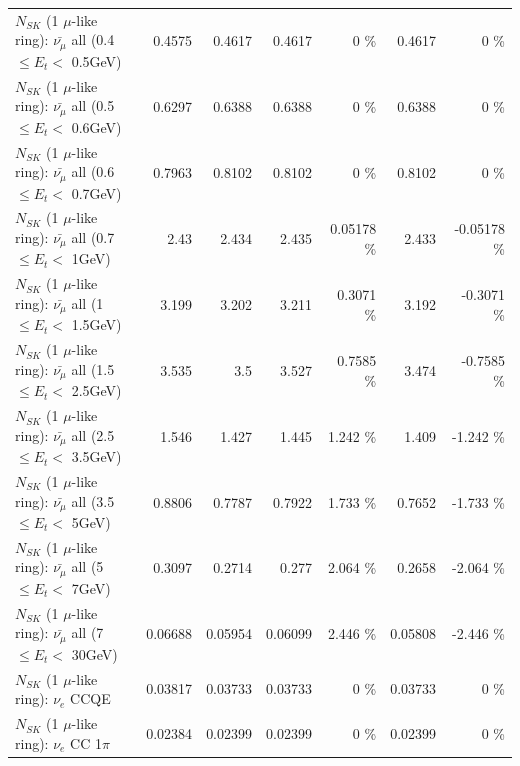\begin{table}
\begin{tabular}{| l | r | r | r  r | r  r |}
 $N_{SK}$ (1 $\mu$-like ring): $\bar{\nu_{\mu}}$ all (0.4 $\leq E_{t} <$ 0.5GeV) &          0.4575 &          0.4617 &          0.4617 &        0 \%  &          0.4617 &        0 \%  \\ 
 $N_{SK}$ (1 $\mu$-like ring): $\bar{\nu_{\mu}}$ all (0.5 $\leq E_{t} <$ 0.6GeV) &          0.6297 &          0.6388 &          0.6388 &        0 \%  &          0.6388 &        0 \%  \\ 
 $N_{SK}$ (1 $\mu$-like ring): $\bar{\nu_{\mu}}$ all (0.6 $\leq E_{t} <$ 0.7GeV) &          0.7963 &          0.8102 &          0.8102 &        0 \%  &          0.8102 &        0 \%  \\ 
   $N_{SK}$ (1 $\mu$-like ring): $\bar{\nu_{\mu}}$ all (0.7 $\leq E_{t} <$ 1GeV) &            2.43 &           2.434 &           2.435 &  0.05178 \%  &           2.433 & -0.05178 \%  \\ 
   $N_{SK}$ (1 $\mu$-like ring): $\bar{\nu_{\mu}}$ all (1 $\leq E_{t} <$ 1.5GeV) &           3.199 &           3.202 &           3.211 &   0.3071 \%  &           3.192 &  -0.3071 \%  \\ 
 $N_{SK}$ (1 $\mu$-like ring): $\bar{\nu_{\mu}}$ all (1.5 $\leq E_{t} <$ 2.5GeV) &           3.535 &             3.5 &           3.527 &   0.7585 \%  &           3.474 &  -0.7585 \%  \\ 
 $N_{SK}$ (1 $\mu$-like ring): $\bar{\nu_{\mu}}$ all (2.5 $\leq E_{t} <$ 3.5GeV) &           1.546 &           1.427 &           1.445 &    1.242 \%  &           1.409 &   -1.242 \%  \\ 
   $N_{SK}$ (1 $\mu$-like ring): $\bar{\nu_{\mu}}$ all (3.5 $\leq E_{t} <$ 5GeV) &          0.8806 &          0.7787 &          0.7922 &    1.733 \%  &          0.7652 &   -1.733 \%  \\ 
     $N_{SK}$ (1 $\mu$-like ring): $\bar{\nu_{\mu}}$ all (5 $\leq E_{t} <$ 7GeV) &          0.3097 &          0.2714 &           0.277 &    2.064 \%  &          0.2658 &   -2.064 \%  \\ 
    $N_{SK}$ (1 $\mu$-like ring): $\bar{\nu_{\mu}}$ all (7 $\leq E_{t} <$ 30GeV) &         0.06688 &         0.05954 &         0.06099 &    2.446 \%  &         0.05808 &   -2.446 \%  \\ 
\hline
\hline
\hline
                                      $N_{SK}$ (1 $\mu$-like ring): $\nu_e$ CCQE &         0.03817 &         0.03733 &         0.03733 &        0 \%  &         0.03733 &        0 \%  \\ 
                                 $N_{SK}$ (1 $\mu$-like ring): $\nu_e$ CC 1$\pi$ &         0.02384 &         0.02399 &         0.02399 &        0 \%  &         0.02399 &        0 \%  \\ 

\end{tabular}
\end{table}
